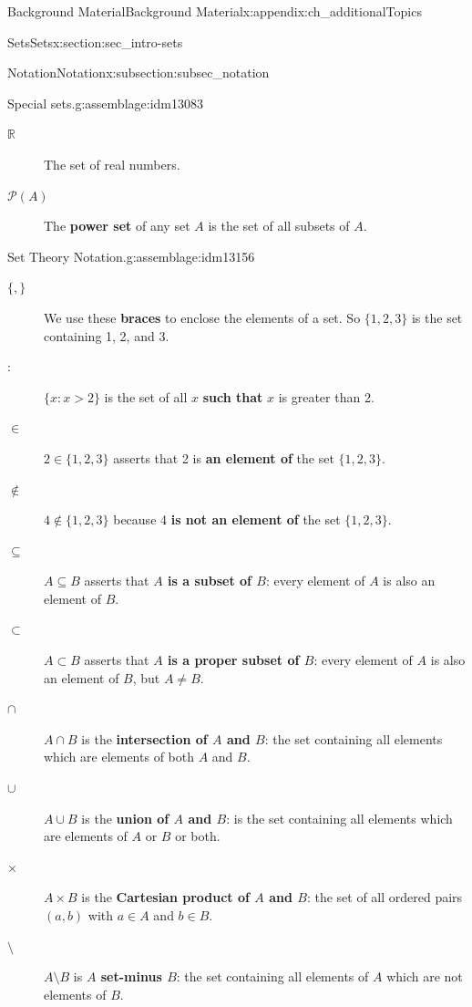 \documentclass[oneside,10pt,]{book}
\newcommand{\terminology}[1]{\textbf{#1}}
\numberwithin{equation}{chapter}
\def\R{\mathbb R}
\def\pow{\mathcal P}
\def\st{:}
\begin{document}
\begin{appendixptx}{Background Material}{}{Background Material}{}{}{x:appendix:ch_additionalTopics}
\begin{sectionptx}{Sets}{}{Sets}{}{}{x:section:sec_intro-sets}
\begin{subsectionptx}{Notation}{}{Notation}{}{}{x:subsection:subsec_notation}
\begin{assemblage}{Special sets.}{g:assemblage:idm13083}
\begin{description}
\item[{\(\R\)}]The set of real numbers.      \label{g:notation:idm13140}%
\item[{\(\pow(A)\)}]The \terminology{power set} of any set \(A\) is the set of all subsets of \(A\).\label{g:notation:idm13152}%
\end{description}
%
\end{assemblage}
\begin{assemblage}{Set Theory Notation.}{g:assemblage:idm13156}%
%
\begin{description}
\item[{\(\{, \}\)}]We use these \terminology{braces} to enclose the elements of a set. So \(\{1,2,3\}\) is the set containing 1, 2, and 3.\label{g:notation:idm13166}%
\item[{\(\st\)}]\(\{x \st x > 2\}\) is the set of all \(x\) \terminology{such that} \(x\) is greater than 2.\label{g:notation:idm13177}%
\item[{\(\in\)}]\(2 \in \{1,2,3\}\) asserts that 2 is \terminology{an element of} the set \(\{1,2,3\}\). \label{g:notation:idm13188}%
\item[{\(\not\in\)}]\(4 \notin \{1,2,3\}\) because 4 \terminology{is not an element of} the set \(\{1,2,3\}\).%
\item[{\(\subseteq\)}]\(A \subseteq B\) asserts that \terminology{\(A\) is a subset of \(B\)}: every element of \(A\) is also an element of \(B\).      \label{g:notation:idm13209}%
\item[{\(\subset\)}]\(A \subset B\) asserts that  \terminology{\(A\) is a proper subset of \(B\)}: every element of \(A\) is also an element of \(B\), but \(A \ne B\).\label{g:notation:idm13224}%
\item[{\(\cap\)}]\(A \cap B\) is the \terminology{intersection of \(A\) and \(B\)}: the set containing all elements which are elements of both \(A\) and \(B\). \label{g:notation:idm13238}%
\item[{\(\cup\)}]\(A \cup B\) is the \terminology{union of \(A\) and \(B\)}: is the set containing all elements which are elements of \(A\) or \(B\) or both.\label{g:notation:idm13253}%
\item[{\(\times\)}]\(A \times B\) is the \terminology{Cartesian product of \(A\) and   \(B\)}: the set of all ordered pairs \((a,b)\) with \(a \in A\) and \(b \in B\).\label{g:notation:idm13269}%
\item[{\(\setminus\)}]\(A \setminus B\) is \terminology{\(A\) set-minus \(B\)}: the set containing all elements of \(A\) which are not elements of \(B\).\label{g:notation:idm13282}%

\end{description}
\end{assemblage}
\end{subsectionptx}
\end{sectionptx}
\end{appendixptx}
\end{document}
